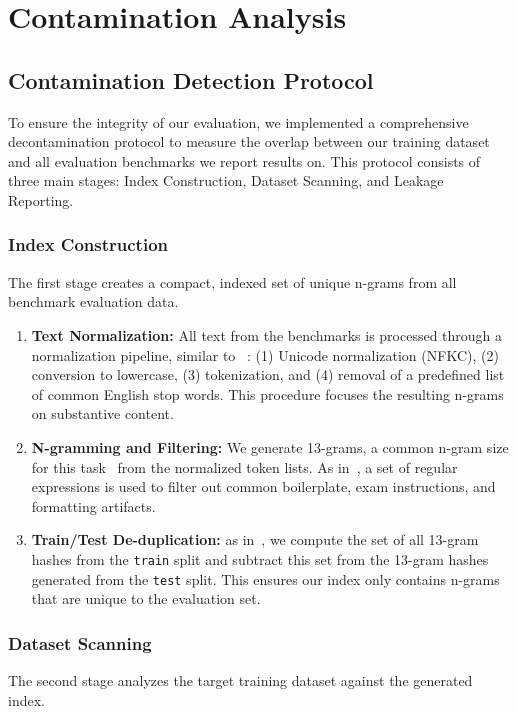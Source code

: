 \section{Contamination Analysis}
\label{app:contamination}
\subsection{Contamination Detection Protocol}


To ensure the integrity of our evaluation, we implemented a comprehensive decontamination protocol to measure the overlap between our training dataset and all evaluation benchmarks we report results on. This protocol consists of three main stages: Index Construction, Dataset Scanning, and Leakage Reporting.

\subsubsection{Index Construction}
The first stage creates a compact, indexed set of unique n-grams from all benchmark evaluation data.

\begin{enumerate}
    \item \textbf{Text Normalization:} All text from the benchmarks is processed through a  normalization pipeline, similar to ~\cite{NEURIPS2022_ce9e92e3}: (1) Unicode normalization (NFKC), (2) conversion to lowercase, (3) tokenization, and (4) removal of a predefined list of common English stop words. This procedure focuses the resulting n-grams on substantive content.
    
    \item \textbf{N-gramming and Filtering:} We generate 13-grams, a common n-gram size for this task~\cite{brown2020language, gao2020pile} from the normalized token lists. As in~\cite{NEURIPS2022_ce9e92e3}, a set of regular expressions is used to filter out common boilerplate, exam instructions, and formatting artifacts.

     \item \textbf{Train/Test De-duplication:} as in~\cite{gao2020pile}, we compute the set of all 13-gram hashes from the \texttt{train} split and subtract this set from the 13-gram hashes generated from the \texttt{test} split. This ensures our index only contains n-grams that are unique to the evaluation set.
\end{enumerate}
\subsubsection{Dataset Scanning}
The second stage analyzes the target training dataset against the generated index.

